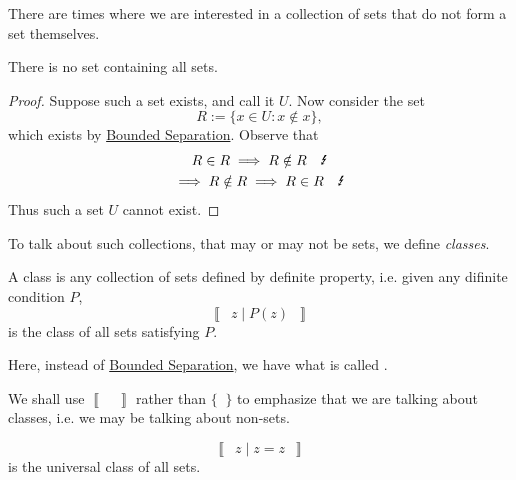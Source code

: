 \documentclass[notoc,notitlepage]{tufte-book}
\newcommand{\class}[1]{\left\llbracket \enspace #1 \enspace \right\rrbracket}
\begin{document}
There are times where we are interested in a collection of sets that do not form a set themselves.

\begin{eg}
  There is no set containing all sets.

  \begin{proof}
    Suppose such a set exists, and call it $U$. Now consider the set
    \begin{equation*}
      R := \{ x \in U : x \notin x \},
    \end{equation*}
    which exists by \hyperref[axiom:bounded_separation_axiom]{Bounded Separation}. Observe that
    \begin{gather*}
      R \in R \implies R \notin R \quad \text{\Lightning} \\
      \implies R \notin R \implies R \in R \quad \text{\Lightning}
    \end{gather*}
    Thus such a set $U$ cannot exist.
  \end{proof}
\end{eg}

To talk about such collections, that may or may not be sets, we define \textit{classes}.

\begin{defn}[Class]
\label{defn:class}
  A class is any collection of sets defined by definite property, i.e. given any difinite condition $P$,
  \begin{equation*}
    \class{ z \mid P(z) }
  \end{equation*}
  is the class of all sets satisfying $P$.
\end{defn}

Here, instead of \hyperref[axiom:bounded_separation_axiom]{Bounded Separation}, we have what is called .

\begin{note}
  We shall use $\class{}$ rather than $\{ \; \; \}$ to emphasize that we are talking about classes, i.e. we may be talking about non-sets.
\end{note}

\begin{eg}
  \begin{equation*}
    \class{ z \mid z = z }
  \end{equation*}
  is the universal class of all sets.
\end{eg}
\end{document}
